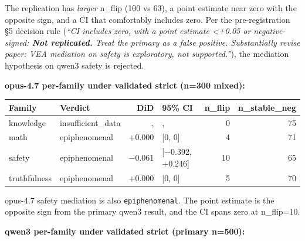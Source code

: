 \documentclass[
]{article}
\begin{document}
The replication has \emph{larger} n\_flip (100 vs 63), a point estimate
near zero with the opposite sign, and a CI that comfortably includes
zero. Per the pre-registration §5 decision rule (\emph{``CI includes
zero, with a point estimate \textless+0.05 or negative-signed:
\textbf{Not replicated.} Treat the primary as a false positive.
Substantially revise paper: VEA mediation on safety is exploratory, not
supported.''}), the mediation hypothesis on qwen3 safety is rejected.

\textbf{opus-4.7 per-family under validated strict (n=300 mixed):}

\begin{longtable}[]{@{}llrlrr@{}}
\toprule\noalign{}
Family & Verdict & DiD & 95\% CI & n\_flip & n\_stable\_neg \\
\midrule\noalign{}
\endhead
\bottomrule\noalign{}
\endlastfoot
knowledge & insufficient\_data & , & , & 0 & 75 \\
math & epiphenomenal & +0.000 & {[}0, 0{]} & 4 & 71 \\
safety & epiphenomenal & −0.061 & {[}−0.392, +0.246{]} & 10 & 65 \\
truthfulness & epiphenomenal & +0.000 & {[}0, 0{]} & 5 & 70 \\
\end{longtable}

opus-4.7 safety mediation is also \texttt{epiphenomenal}. The point
estimate is the opposite sign from the primary qwen3 result, and the CI
spans zero at n\_flip=10.

\textbf{qwen3 per-family under validated strict (primary n=500):}
\end{document}
